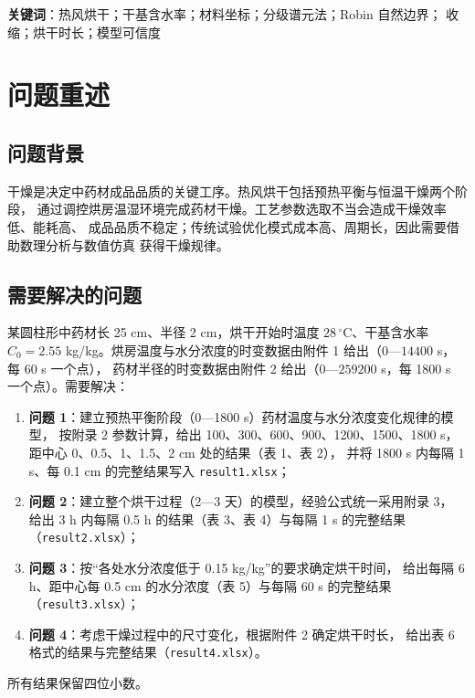 \documentclass[12pt,a4paper]{ctexart}
\begin{document}
\vspace{6pt}
\noindent\textbf{关键词}：热风烘干；干基含水率；材料坐标；分级谱元法；Robin 自然边界；
收缩；烘干时长；模型可信度

\newpage

\section{问题重述}

\subsection{问题背景}
干燥是决定中药材成品品质的关键工序。热风烘干包括预热平衡与恒温干燥两个阶段，
通过调控烘房温湿环境完成药材干燥。工艺参数选取不当会造成干燥效率低、能耗高、
成品品质不稳定；传统试验优化模式成本高、周期长，因此需要借助数理分析与数值仿真
获得干燥规律。

\subsection{需要解决的问题}
某圆柱形中药材长 25 cm、半径 2 cm，烘干开始时温度 $28\,^\circ$C、干基含水率
$C_0=2.55$ kg/kg。烘房温度与水分浓度的时变数据由附件 1 给出（$0$—$14400$ s，每 60 s 一个点），
药材半径的时变数据由附件 2 给出（$0$—$259200$ s，每 1800 s 一个点）。需要解决：

\begin{enumerate}[label=（\arabic*）,leftmargin=2.2em,itemsep=1pt]
  \item \textbf{问题 1}：建立预热平衡阶段（0—1800 s）药材温度与水分浓度变化规律的模型，
        按附录 2 参数计算，给出 100、300、600、900、1200、1500、1800 s，
        距中心 0、0.5、1、1.5、2 cm 处的结果（表 1、表 2），
        并将 1800 s 内每隔 1 s、每 0.1 cm 的完整结果写入 \texttt{result1.xlsx}；
  \item \textbf{问题 2}：建立整个烘干过程（2—3 天）的模型，经验公式统一采用附录 3，
        给出 3 h 内每隔 0.5 h 的结果（表 3、表 4）与每隔 1 s 的完整结果（\texttt{result2.xlsx}）；
  \item \textbf{问题 3}：按“各处水分浓度低于 0.15 kg/kg”的要求确定烘干时间，
        给出每隔 6 h、距中心每 0.5 cm 的水分浓度（表 5）与每隔 60 s 的完整结果（\texttt{result3.xlsx}）；
  \item \textbf{问题 4}：考虑干燥过程中的尺寸变化，根据附件 2 确定烘干时长，
        给出表 6 格式的结果与完整结果（\texttt{result4.xlsx}）。
\end{enumerate}
所有结果保留四位小数。
\end{document}
